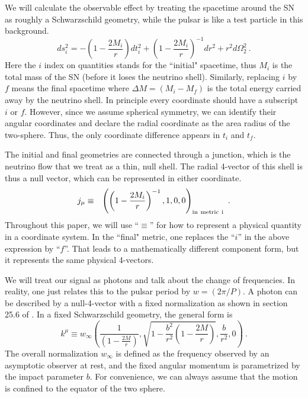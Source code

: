 \documentclass[aps,showpacs,twocolumn,floats,prd,superscriptaddress,nofootinbib]{revtex4-1}
\begin{document}
We will calculate the observable effect by treating the spacetime around the SN as roughly a Schwarzschild geometry, while the pulsar is like a test particle in this background.
\begin{equation}
	ds_i^2 = -\left( 1 -\frac{2M_i}{r}\right) dt_i^2 + \left( 1 -\frac{2M_i}{r} \right)^{-1} dr^2 + r^2 d \Omega_2^2~.	\label{2.1}
\end{equation}
Here the $i$ index on quantities stands for the ``initial" spacetime, thus $M_i$ is the total mass of the SN (before it loses the neutrino shell). Similarly, replacing $i$ by $f$ means the final spacetime where $\Delta M = (M_i-M_f)$ is the total energy carried away by the neutrino shell. In principle every coordinate should have a subscript $i$ or $f$. However, since we assume spherical symmetry, we can identify their angular coordinates and declare the radial coordinate as the area radius of the two-sphere. Thus, the only coordinate difference appears in $t_i$ and $t_f$. 

The initial and final geometries are connected through a junction, which is the neutrino flow that we treat as a thin, null shell. The radial 4-vector of this shell is thus a null vector, which can be represented in either coordinate.
\begin{eqnarray}
j_\mu &\equiv& \left( \left(1-\frac{2M_i}{r}\right)^{-1} ,  1 , 0 , 0 \right)_{\rm in \ metric \ i}~.
\end{eqnarray}
Throughout this paper, we will use ``$\equiv$'' for how to represent a physical quantity in a coordinate system. In the ``final" metric, one replaces the ``$i$'' in the above expression by ``$f$''. That leads to a mathematically different component form, but it represents the same physical 4-vectors.

We will treat our signal as photons and talk about the change of frequencies. In reality, one just relates this to the pulsar period by $w=(2\pi/P)$. A photon can be described by a null-4-vector with a fixed normalization as shown in section 25.6 of \cite{MTW}. In a fixed Schwarzschild geometry, the general form is
\begin{equation}
	k^\mu \equiv w_{\infty}\left( \frac{1}{(1- \frac{2M}{r})}, \sqrt{ 1 - \frac{b^2}{r^2} \left( 1 - \frac{2M}{r} \right)}, \frac{b}{r^2}, 0 \right)~. \label{eq-photon}	
\end{equation}
The overall normalization $w_{\infty}$ is defined as the frequency observed by an asymptotic observer at rest, and the fixed angular momentum is parametrized by the impact parameter $b$. For convenience, we can always assume that the motion is confined to the equator of the two sphere.
\end{document}
